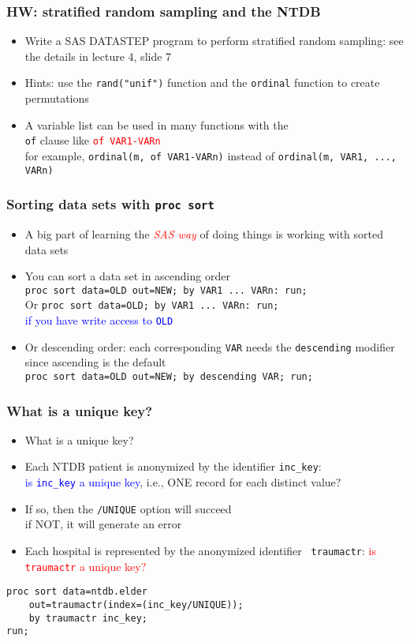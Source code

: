 \documentclass[11pt,pdftex,dvipsnames,usenames,helvetica]{beamer}
\begin{document}
\begin{frame}[fragile]
\frametitle{HW: stratified random sampling and the NTDB}
\begin{itemize}
\item Write a SAS DATASTEP program to perform stratified random sampling:
see the details in lecture 4, slide 7
\item Hints: use the {\tt rand("unif")} function and the {\tt ordinal}
function to create permutations
\item A variable list can be used in many functions with the\\ 
{\tt of} clause like \textcolor{red}{\tt of VAR1-VARn}\\
for example, 
{\tt ordinal(m, of VAR1-VARn)} instead of {\tt ordinal(m, VAR1, ..., VARn)}
\end{itemize}
\end{frame}


\begin{frame}[fragile]
\frametitle{Sorting data sets with {\tt proc sort}}
\begin{itemize}
\item A big part of learning the \textcolor{red}{\it SAS way} of doing things
is working with sorted data sets 
\item You can sort a data set in ascending order\\ 
{\tt proc sort data=OLD out=NEW; by VAR1 ...\ VARn: run;}\\
Or {\tt proc sort data=OLD; by VAR1 ...\ VARn: run;}\\
\textcolor{blue}{if you have write access to {\tt OLD}}
\item Or descending order: each corresponding {\tt VAR} needs the
{\tt descending} modifier since ascending is the default\\ 
{\tt proc sort data=OLD out=NEW; by descending VAR; run;}
\end{itemize}

\end{frame}

\begin{frame}[fragile]
\frametitle{What is a unique key?}
\begin{itemize}
\item What is a unique key?
\item Each NTDB patient is anonymized by the identifier {\tt inc\_key}:\\
  \textcolor{blue}{is {\tt inc\_key} a unique key}, i.e., ONE record
  for each distinct value?
\item If so, then the {\tt /UNIQUE} option will succeed\\
if NOT, it will generate an error
\item Each hospital is represented by the anonymized identifier {\tt
    traumactr}: \textcolor{red}{is {\tt traumactr} a unique key?}
\end{itemize}
\begin{verbatim}
proc sort data=ntdb.elder 
    out=traumactr(index=(inc_key/UNIQUE));
    by traumactr inc_key;
run;
\end{verbatim}
\end{frame}
\end{document}
